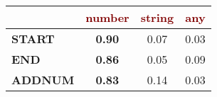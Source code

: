 \renewcommand{\arraystretch}{0.5}
\scriptsize
\begin{tabular}{@{}l c@{\hskip 1mm} c@{\hskip 1mm} c@{}}
\toprule
& \textbf{\textcolor{Maroon}{number}} & \textbf{\textcolor{Maroon}{string}} & \textbf{\textcolor{Maroon}{any}}\\ 
\midrule
\textbf{\textcolor{mygreen}{START}} & \textbf{0.90} & 0.07 & 0.03\\
\textbf{\textcolor{mygreen}{END}} & \textbf{0.86} & 0.05 & 0.09\\
\textbf{\textcolor{mygreen}{ADDNUM}} & \textbf{0.83} & 0.14 & 0.03\\
\bottomrule
\end{tabular}
